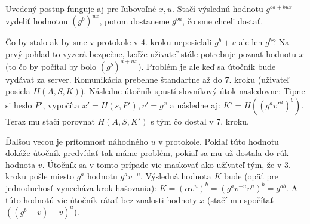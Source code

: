 \begin{poznamka}
Uvedený postup funguje aj pre ľubovoľné $x, u$. Stačí výslednú hodnotu
$g^{ba+bux}$ vydeliť hodnotou $(g^b)^{ux}$, potom dostaneme $g^{ba}$, čo sme chceli dostať.
\end{poznamka}

Čo by stalo ak by sme v protokole v 4. kroku neposielali $g^b + v$ ale len $g^b$?
Na prvý pohľad to vyzerá bezpečne, keďže uživateľ stále potrebuje poznať hodnotu $x$
(to čo by počítal by bolo $(g^b)^{a+ux}$). Problém je ale keď sa útočník bude vydávať
za server. Komunikácia prebehne štandartne až do 7. kroku (uživateľ posiela $H(A,S,K)$).
Následne útočník spustí slovníkový útok nasledovne:
Tipne si heslo $P'$, vypočíta $x' = H(s,P'), v' = g^x$ a následne aj:
$K' = H((g^a v'^u)^b)$. Teraz mu stačí porovnať $H(A,S,K')$ s tým čo dostal v 7. kroku.

Ďalšou vecou je prítomnosť náhodného $u$ v protokole. Pokiaľ túto hodnotu dokáže
útočník predvídať tak máme problém, pokiaľ sa mu už dostala do rúk hodnota $v$.
Útočník sa v tomto prípade vie maskovať ako užívateľ tým, že v 3. kroku pošle miesto
$g^a$ hodnotu $g^a v^{-u}$. Výsledná hodnota $K$ bude (opäť pre jednoduchosť vynecháva krok hašovania):
$K = (\alpha v^u)^b = (g^a v^{-u} v^u)^b = g^{ab}$. A túto hodnotú vie útočník
rátať bez znalosti hodnoty $x$ (stačí mu spočítať $((g^b + v) - v)^a$).

